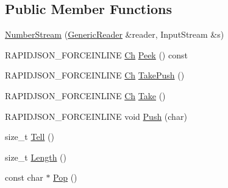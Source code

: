 \subsection*{Public Member Functions}
\begin{DoxyCompactItemize}
\item 
\mbox{\hyperlink{classrapidjson_1_1_generic_reader_1_1_number_stream_3_01_input_stream_00_01false_00_01false_01_4_a7ff325d27585f83566198c0b3f1a008e}{Number\+Stream}} (\mbox{\hyperlink{classrapidjson_1_1_generic_reader}{Generic\+Reader}} \&reader, Input\+Stream \&s)
\item 
R\+A\+P\+I\+D\+J\+S\+O\+N\+\_\+\+F\+O\+R\+C\+E\+I\+N\+L\+I\+NE \mbox{\hyperlink{classrapidjson_1_1_generic_reader_1_1_number_stream_3_01_input_stream_00_01false_00_01false_01_4_a2a945ef08d04099027c32f72821a12c0}{Ch}} \mbox{\hyperlink{classrapidjson_1_1_generic_reader_1_1_number_stream_3_01_input_stream_00_01false_00_01false_01_4_a0b923b6e8529d0e52ace7b20bd502278}{Peek}} () const
\item 
R\+A\+P\+I\+D\+J\+S\+O\+N\+\_\+\+F\+O\+R\+C\+E\+I\+N\+L\+I\+NE \mbox{\hyperlink{classrapidjson_1_1_generic_reader_1_1_number_stream_3_01_input_stream_00_01false_00_01false_01_4_a2a945ef08d04099027c32f72821a12c0}{Ch}} \mbox{\hyperlink{classrapidjson_1_1_generic_reader_1_1_number_stream_3_01_input_stream_00_01false_00_01false_01_4_a27a94e285041896774880f71e9f01edc}{Take\+Push}} ()
\item 
R\+A\+P\+I\+D\+J\+S\+O\+N\+\_\+\+F\+O\+R\+C\+E\+I\+N\+L\+I\+NE \mbox{\hyperlink{classrapidjson_1_1_generic_reader_1_1_number_stream_3_01_input_stream_00_01false_00_01false_01_4_a2a945ef08d04099027c32f72821a12c0}{Ch}} \mbox{\hyperlink{classrapidjson_1_1_generic_reader_1_1_number_stream_3_01_input_stream_00_01false_00_01false_01_4_af8070781ef2cf23908a6fd06c3d6c338}{Take}} ()
\item 
R\+A\+P\+I\+D\+J\+S\+O\+N\+\_\+\+F\+O\+R\+C\+E\+I\+N\+L\+I\+NE void \mbox{\hyperlink{classrapidjson_1_1_generic_reader_1_1_number_stream_3_01_input_stream_00_01false_00_01false_01_4_a50ee2c2967609013d894b2bf24b67c91}{Push}} (char)
\item 
size\+\_\+t \mbox{\hyperlink{classrapidjson_1_1_generic_reader_1_1_number_stream_3_01_input_stream_00_01false_00_01false_01_4_ab4244051ebbc7abee882ddff3ec382b6}{Tell}} ()
\item 
size\+\_\+t \mbox{\hyperlink{classrapidjson_1_1_generic_reader_1_1_number_stream_3_01_input_stream_00_01false_00_01false_01_4_a782d42c26037827aa5a0ae61580174ba}{Length}} ()
\item 
const char $\ast$ \mbox{\hyperlink{classrapidjson_1_1_generic_reader_1_1_number_stream_3_01_input_stream_00_01false_00_01false_01_4_a024d9527ff6a1f0167a2e2c6b364cd72}{Pop}} ()
\end{DoxyCompactItemize}
